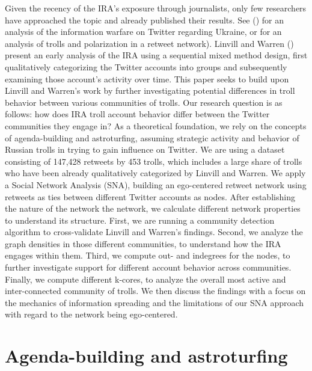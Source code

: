 \documentclass[12pt, titlepage=true, toc=bib]{scrartcl}
\begin{document}
Given the recency of the IRA's exposure through journalists, only few researchers have approached the topic and already published their results. See (\cite*[]{golovchenko_state_2018}) for an analysis of the information warfare on Twitter regarding Ukraine, or \textcite{stewart_examining_2018} for an analysis of trolls and polarization in a retweet network). Linvill and Warren (\cite*{linvill_troll_2018}) present an early analysis of the IRA using a sequential mixed method design, first qualitatively categorizing the Twitter accounts into groups and subsequently examining those account's activity over time. This paper seeks to build upon Linvill and Warren's work by further investigating potential differences in troll behavior between various communities of trolls. Our research question is as follows: how does IRA troll account behavior differ between the Twitter communities they engage in? As a theoretical foundation, we rely on the concepts of agenda-building and astroturfing, assuming strategic activity and behavior of Russian trolls in trying to gain influence on Twitter. We are using a dataset consisting of 147,428 retweets by 453 trolls, which includes a large share of trolls who have been already qualitatively categorized by Linvill and Warren. We apply a Social Network Analysis (SNA), building an ego-centered retweet network using retweets as ties between different Twitter accounts as nodes. After establishing the nature of the network the network, we calculate different network properties to understand its structure. First, we are running a community detection algorithm to cross-validate Linvill and Warren's findings. Second, we analyze the graph densities in those different communities, to understand how the IRA engages within them. Third, we compute out- and indegrees for the nodes, to further investigate support for different account behavior across communities. Finally, we compute different k-cores, to analyze the overall most active and inter-connected community of trolls. We then discuss the findings with a focus on the mechanics of information spreading and the limitations of our SNA approach with regard to the network being ego-centered.


\section{Agenda-building and astroturfing}
\end{document}
